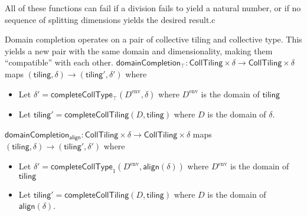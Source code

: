 \filbreak
All of these functions can fail if a division fails to yield a natural number, or if no sequence of splitting dimensions yields the desired result.c

\filbreak
{}

Domain completion operates on a pair of collective tiling and collective type.
This yields a new pair with the same domain and dimensionality, making them ``compatible'' with each other.
\filbreak
$\mathsf{domainCompletion_\top} : \mathsf{CollTiling} \times \delta \to \mathsf{CollTiling} \times \delta$
maps $(\mathsf{tiling}, \delta) \to (\mathsf{tiling}', \delta')$ where
\begin{itemize}
  \item Let $\delta' = \mathsf{completeCollType}_\top(D^\text{env}, \delta)$
    where $D^\text{env}$ is the domain of $\mathsf{tiling}$
  \filbreak
  \item Let $\mathsf{tiling}' = \mathsf{completeCollTiling}(D, \mathsf{tiling})$
    where $D$ is the domain of $\delta$.
\end{itemize}
\filbreak
$\mathsf{domainCompletion_{align}} : \mathsf{CollTiling} \times \delta \to \mathsf{CollTiling} \times \delta$
maps $(\mathsf{tiling}, \delta) \to (\mathsf{tiling}', \delta')$ where
\begin{itemize}
  \item Let $\delta' = \mathsf{completeCollType}_1(D^\text{env}, \mathsf{align}(\delta))$
    where $D^\text{env}$ is the domain of $\mathsf{tiling}$
  \filbreak
  \item Let $\mathsf{tiling}' = \mathsf{completeCollTiling}(D, \mathsf{tiling})$
    where $D$ is the domain of $\mathsf{align}(\delta)$.
\end{itemize}

\filbreak
{}


